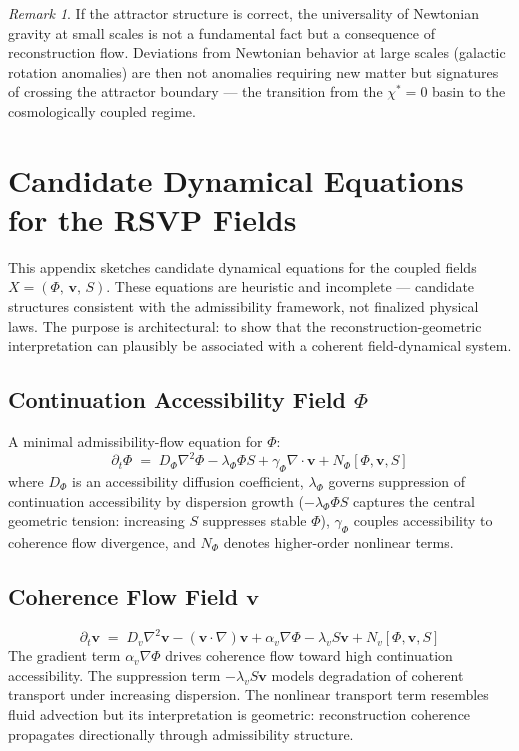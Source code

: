 \documentclass[11pt, a4paper]{article}
\theoremstyle{plain}
\theoremstyle{definition}
\theoremstyle{remark}
\newtheorem{remark}[theorem]{Remark}
\newcommand{\Xfield}{X = (\Phi,\,\mathbf{v},\,S)}
\begin{document}
\begin{remark}
If the attractor structure is correct, the universality of Newtonian gravity at small
scales is not a fundamental fact but a consequence of reconstruction flow. Deviations
from Newtonian behavior at large scales (galactic rotation anomalies) are then not
anomalies requiring new matter but signatures of crossing the attractor boundary ---
the transition from the $\chi^* = 0$ basin to the cosmologically coupled regime.
\end{remark}
\section{Candidate Dynamical Equations for the RSVP Fields}
\label{app:dynamics}

This appendix sketches candidate dynamical equations for the coupled fields
$\Xfield$. These equations are heuristic and incomplete --- candidate structures
consistent with the admissibility framework, not finalized physical laws. The purpose
is architectural: to show that the reconstruction-geometric interpretation can
plausibly be associated with a coherent field-dynamical system.

\subsection{Continuation Accessibility Field $\Phi$}

A minimal admissibility-flow equation for $\Phi$:
\begin{equation}
  \label{eq:Phi}
  \partial_t\Phi \;=\; D_\Phi\nabla^2\Phi - \lambda_\Phi \Phi S
    + \gamma_\Phi \nabla\cdot\mathbf{v} + N_\Phi[\Phi,\mathbf{v},S]
\end{equation}
where $D_\Phi$ is an accessibility diffusion coefficient, $\lambda_\Phi$ governs
suppression of continuation accessibility by dispersion growth ($-\lambda_\Phi \Phi
S$ captures the central geometric tension: increasing $S$ suppresses stable $\Phi$),
$\gamma_\Phi$ couples accessibility to coherence flow divergence, and $N_\Phi$
denotes higher-order nonlinear terms.

\subsection{Coherence Flow Field $\mathbf{v}$}

\begin{equation}
  \label{eq:v}
  \partial_t\mathbf{v} \;=\; D_v\nabla^2\mathbf{v} - (\mathbf{v}\cdot\nabla)\mathbf{v}
    + \alpha_v\nabla\Phi - \lambda_v S\mathbf{v} + N_v[\Phi,\mathbf{v},S]
\end{equation}
The gradient term $\alpha_v\nabla\Phi$ drives coherence flow toward high continuation
accessibility. The suppression term $-\lambda_v S\mathbf{v}$ models degradation of
coherent transport under increasing dispersion. The nonlinear transport term resembles
fluid advection but its interpretation is geometric: reconstruction coherence
propagates directionally through admissibility structure.
\end{document}
